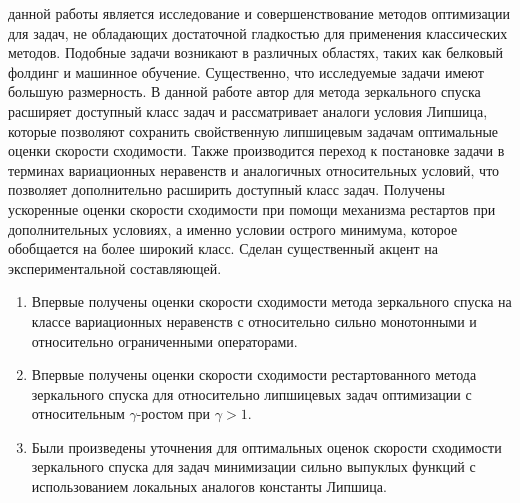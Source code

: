 {\aim}  данной работы является исследование и совершенствование методов оптимизации для задач, не обладающих достаточной гладкостью для применения классических методов. Подобные задачи возникают в различных областях, таких как белковый фолдинг и машинное обучение. Существенно, что исследуемые задачи имеют большую размерность. В данной работе автор для метода зеркального спуска расширяет доступный класс задач и рассматривает аналоги условия Липшица, которые позволяют сохранить свойственную липшицевым задачам оптимальные оценки скорости сходимости. Также производится переход к постановке задачи в терминах вариационных неравенств и аналогичных относительных условий, что позволяет дополнительно расширить доступный класс задач. Получены ускоренные оценки скорости сходимости при помощи механизма рестартов при дополнительных условиях, а именно условии острого минимума, которое обобщается на более широкий класс. Сделан существенный акцент на экспериментальной составляющей.

{\novelty}
\begin{enumerate}[beginpenalty=10000] %
  \item Впервые получены оценки скорости сходимости метода зеркального спуска на классе вариационных неравенств с относительно сильно монотонными и относительно ограниченными операторами. 
  \item Впервые получены оценки скорости сходимости рестартованного метода зеркального спуска для относительно липшицевых задач оптимизации с относительным $\gamma$-ростом при $\gamma > 1$. 
  \item Были произведены уточнения для оптимальных оценок скорости сходимости зеркального спуска для задач минимизации сильно выпуклых функций с использованием локальных аналогов константы Липшица. 
\end{enumerate}

